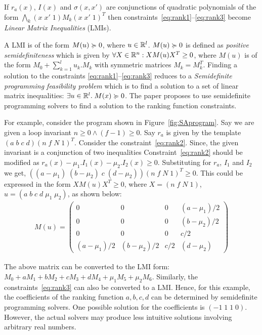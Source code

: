 If $r_a(x)$, $I(x)$ and $\sigma(x,x')$ are conjunctions of quadratic polynomials 
of the form $\bigwedge_k (x \; x' \; 1) M_k (x \; x' \; 1)^T$ then constraints~\ref{eq:rank1}--\ref{eq:rank3} become \emph{Linear Matrix Inequalities} (LMIs). 

A LMI is of the form  $M(u) \succcurlyeq 0$, where $u \in \mathbb{R}^l$. 
$M(u) \succcurlyeq 0$ is defined as \emph{positive semidefiniteness} which is 
given by $\forall X \in \mathbb{R}^n: X M(u) X^T \ge 0$, where 
$M(u)$ is of the form $M_0 + \sum \limits_{k=1}^{l} u_k. M_k$ with
symmetric matrices $M_k = M_k^T$.
Finding a solution to the constraints \ref{eq:rank1}--\ref{eq:rank3}
reduces to a \emph{Semidefinite programming feasibility problem} which 
is to find a solution to a set of linear
matrix inequalities: $\exists u \in \mathbb{R}^l. \; M(x) \succcurlyeq 0$.
The paper proposes to use semidefinite programming solvers 
to find a solution to the ranking function constraints.

For example, consider the program shown in Figure~\ref{fig:SAprogram}.
Say we are given a loop invariant $n \ge 0 \wedge (f-1) \ge 0$.
Say $r_a$ is given by the template $(a \; b \; c \; d)(n \; f \; N \; 1)^T$. 
Consider the constraint~\ref{eq:rank2}. Since, the given invariant 
is a conjunction of two inequalities Constraint~\ref{eq:rank2} should be modified as $r_a(x) - \mu_1.I_1(x)- \mu_2.I_2(x) \ge 0$. 
Substituting for $r_a$, $I_1$ and $I_2$ we get,
$((a- \mu_1) \; (b - \mu_2) \; c \; (d-\mu_2))(n \; f \; N \; 1)^T \ge 0$.
This could be expressed in the form $X M(u) X^T \ge 0$, where 
$X=(n \; f \; N \; 1)$, $u = (a \; b \; c \; d \; \mu_1 \; \mu_2)$, 
as shown below:
%
\begin{align*}
M(u) = 
\left( \begin{array}{cccc} 
0 & 0 & 0 & (a- \mu_1)/2 \\
0 & 0 & 0 & (b- \mu_2)/2 \\
0 & 0 & 0 & c/2 \\
(a- \mu_1)/2 & (b- \mu_2)/2 & c/2 & (d-\mu_2) 
\end{array} \right)
\end{align*}

The above matrix can be converted to the LMI form: 
$M_0 + a M_1 + b M_2 + c M_3 + d M_4 + \mu_1 M_5 + \mu_2 M_6$.
Similarly, the constraints~\ref{eq:rank3} can also be converted to a LMI.
Hence, for this example, the coefficients of the ranking function $a,b,c,d$
can be determined by semidefinite programming solvers.
One possible solution for the coefficients is $(-1 \; 1 \; 1 \; 0)$. However,
the actual solvers may produce less intuitive solutions involving arbitrary real numbers.

